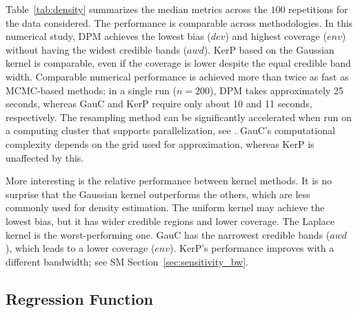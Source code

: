 \documentclass{article}
\theoremstyle{definition}
\renewcommand{\&}{and}
\begin{document}
Table~\ref{tab:density} summarizes the median metrics across the $100$ repetitions for the data considered. The performance is comparable across methodologies. In this numerical study, DPM achieves the lowest bias ($dev$) and highest coverage ($env$) without having the widest credible bands ($awd$). KerP based on the Gaussian kernel is comparable, even if the coverage is lower despite the equal credible band width. Comparable numerical performance is achieved more than twice as fast as MCMC-based methods: in a single run ($n=200$), DPM takes approximately 25 seconds, whereas GauC and KerP require only about 10 and 11 seconds, respectively. The resampling method can be significantly accelerated when run on a computing cluster that supports parallelization, see \cite{fong2021martingale}. GauC's computational complexity depends on the grid used for approximation, whereas KerP is unaffected by this.

More interesting is the relative performance between kernel methods. It is no surprise that the Gaussian kernel outperforms the others, which are less commonly used for density estimation. The uniform kernel may achieve the lowest bias, but it has wider credible regions and lower coverage. The Laplace kernel is the worst-performing one. GauC has the narrowest credible bands ($awd$), which leads to a lower coverage ($env$). KerP's performance improves with a different bandwidth; see SM Section~\ref{sec:sensitivity_bw}.
		

\subsection{Regression Function}\label{sec:ill_regression}
\end{document}
